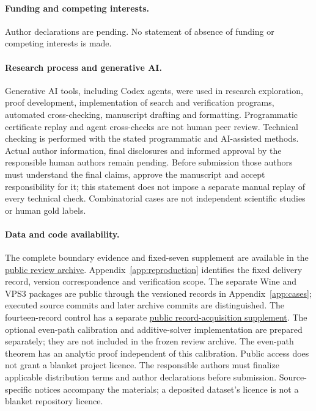 \documentclass[pdflatex,sn-mathphys-num]{sn-jnl}
\theoremstyle{thmstyleone}
\theoremstyle{thmstylethree}
\theoremstyle{thmstyletwo}
\begin{document}
\paragraph*{Funding and competing interests.}
Author declarations are pending. No statement of absence of funding or competing interests is made.
\paragraph*{Research process and generative AI.}
Generative AI tools, including Codex agents, were used in research exploration, proof development, implementation of search and verification programs, automated cross-checking, manuscript drafting and formatting. Programmatic certificate replay and agent cross-checks are not human peer review. Technical checking is performed with the stated programmatic and AI-assisted methods. Actual author information, final disclosures and informed approval by the responsible human authors remain pending. Before submission those authors must understand the final claims, approve the manuscript and accept responsibility for it; this statement does not impose a separate manual replay of every technical check. Combinatorial cases are not independent scientific studies or human gold labels.
\paragraph*{Data and code availability.}
The complete boundary evidence and fixed-seven supplement are available in the \href{https://github.com/SHiJiE1115/newproj/releases/tag/complete-six-review-20261011-v01}{public review archive}. Appendix~\ref{app:reproduction} identifies the fixed delivery record, version correspondence and verification scope. The separate Wine and VPS3 packages are public through the versioned records in Appendix~\ref{app:cases}; executed source commits and later archive commits are distinguished. The fourteen-record control has a separate \href{https://github.com/SHiJiE1115/newproj/tree/78da45ebeff7e74d0cb080114f30172fac3f09f8/theory/record_acquisition_v01}{public record-acquisition supplement}. The optional even-path calibration and additive-solver implementation are prepared separately; they are not included in the frozen review archive. The even-path theorem has an analytic proof independent of this calibration. Public access does not grant a blanket project licence. The responsible authors must finalize applicable distribution terms and author declarations before submission. Source-specific notices accompany the materials; a deposited dataset's licence is not a blanket repository licence.
\end{document}
